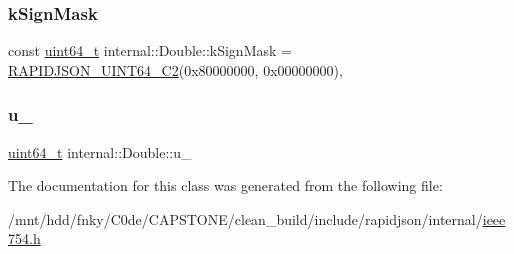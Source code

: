 \mbox{\label{classinternal_1_1Double_a43d4007b0121278555519de8d4fdc59e}} 
\subsubsection{\texorpdfstring{k\+Sign\+Mask}{kSignMask}}
{\footnotesize\ttfamily const \hyperlink{stdint_8h_aec6fcb673ff035718c238c8c9d544c47}{uint64\+\_\+t} internal\+::\+Double\+::k\+Sign\+Mask = \hyperlink{rapidjson_8h_aaee1245f375a71be1ac9b8a07ba5fb8f}{R\+A\+P\+I\+D\+J\+S\+O\+N\+\_\+\+U\+I\+N\+T64\+\_\+\+C2}(0x80000000, 0x00000000)\hspace{0.3cm}{\ttfamily [static]}, {\ttfamily [private]}}

\mbox{\label{classinternal_1_1Double_ad7523f7fe0c47d6aabe34f68b00a3250}} 
\subsubsection{\texorpdfstring{u\+\_\+}{u\_}}
{\footnotesize\ttfamily \hyperlink{stdint_8h_aec6fcb673ff035718c238c8c9d544c47}{uint64\+\_\+t} internal\+::\+Double\+::u\+\_\+}



The documentation for this class was generated from the following file\+:\begin{DoxyCompactItemize}
\item 
/mnt/hdd/fnky/\+C0de/\+C\+A\+P\+S\+T\+O\+N\+E/clean\+\_\+build/include/rapidjson/internal/\hyperlink{ieee754_8h}{ieee754.\+h}\end{DoxyCompactItemize}
